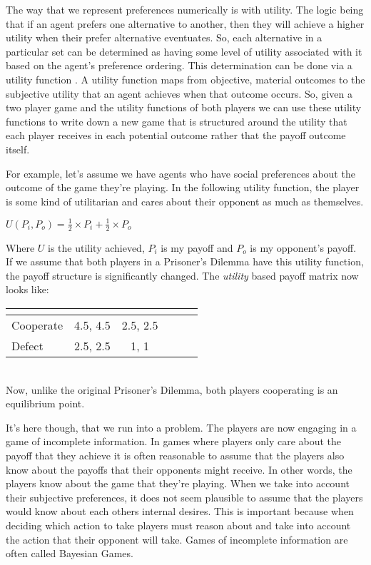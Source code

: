 \documentclass[11pt]{article}
\newcommand*{\np}{\par\noindent\newline}
\begin{document}
\np The way that we represent preferences numerically is with utility. The logic being that if an agent prefers one
alternative to another, then they will achieve a higher utility when their prefer alternative eventuates. So, each
alternative in a particular set can be determined as having some level of utility associated with it based on the
agent's preference ordering. This determination can be done via a utility function \citep{angner_course_2012}. A utility
function maps from objective, material outcomes to the subjective utility that an agent achieves when that outcome
occurs. So, given a two player game and the utility functions of both players we can use these utility functions
to write down a new game that is structured around the utility that each player receives in each potential outcome
rather that the payoff outcome itself.

\np For example, let's assume we have agents who have social preferences about the outcome of the game they're playing.
In the following utility function, the player is some kind of utilitarian and cares about their opponent as much as themselves.
\begin{center}
	\(U(P_i, P_o) = \frac{1}{2} \times P_i + \frac{1}{2} \times P_o\) 
\end{center}
Where $U$ is the utility achieved, $P_i$ is my payoff and $P_o$ is my opponent's payoff.
If we assume that both players in a Prisoner's Dilemma have this utility function, the payoff structure is significantly
changed. The \textit{utility} based payoff matrix now looks like:
\newline
\begin{center}
	\begin{tabular}{|l||*{5}{c|}}\hline
		\label{utility_prisoner}
		\backslashbox{Prisoner A}{Prisoner B}
		&\makebox[7em]{Cooperate}&\makebox[7em]{Defect}\\\hline\hline
		Cooperate & 4.5, 4.5 & 2.5, 2.5\\\hline
		Defect & 2.5, 2.5 & 1, 1 \\\hline
	\end{tabular}
\end{center}\mbox{}\\
Now, unlike the original Prisoner's Dilemma, both players cooperating is an equilibrium point.

\np It's here though, that we run into a problem. The players are now engaging in a game of incomplete information.
In games where players only care about the payoff that they achieve it is often reasonable to assume that the players
also know about the payoffs that their opponents might receive. In other words, the players know about the game that
they're playing. When we take into account their subjective preferences, it does not seem plausible to assume that the
players would know about each others internal desires. This is important because when deciding which action to take
players must reason about and take into account the action that their opponent will take. Games of incomplete
information are often called Bayesian Games.
\end{document}
